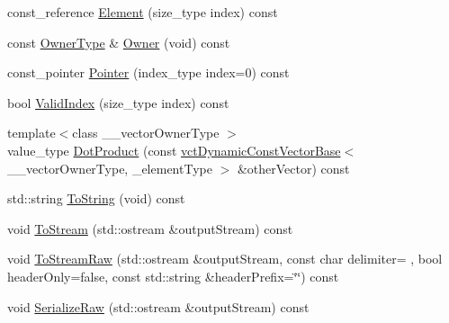 \begin{DoxyCompactItemize}
\item 
const\+\_\+reference \hyperlink{classvct_dynamic_const_vector_base_a0adf25034263fc4587ef5d118019eb6a}{Element} (size\+\_\+type index) const 
\item 
const \hyperlink{classvct_dynamic_const_vector_base_a6d92548fcc7076cbd4c091ceb0faf364}{Owner\+Type} \& \hyperlink{classvct_dynamic_const_vector_base_abc25ad1a425d8b221e3409092b89be68}{Owner} (void) const 
\item 
const\+\_\+pointer \hyperlink{classvct_dynamic_const_vector_base_ad78506ee5fdadb7c879ed4a5a57278e6}{Pointer} (index\+\_\+type index=0) const 
\item 
bool \hyperlink{classvct_dynamic_const_vector_base_a0329d61eeff85f488a78d065a3d092e2}{Valid\+Index} (size\+\_\+type index) const 
\item 
{\footnotesize template$<$class \+\_\+\+\_\+vector\+Owner\+Type $>$ }\\value\+\_\+type \hyperlink{classvct_dynamic_const_vector_base_a802f2332971a128c372a0f08bf0c405b}{Dot\+Product} (const \hyperlink{classvct_dynamic_const_vector_base}{vct\+Dynamic\+Const\+Vector\+Base}$<$ \+\_\+\+\_\+vector\+Owner\+Type, \+\_\+element\+Type $>$ \&other\+Vector) const 
\item 
std\+::string \hyperlink{classvct_dynamic_const_vector_base_a8ce660be7546ef58a69161493b92ce17}{To\+String} (void) const 
\item 
void \hyperlink{classvct_dynamic_const_vector_base_af7c7a1230789a78079b4c27dd5a16f1f}{To\+Stream} (std\+::ostream \&output\+Stream) const 
\item 
void \hyperlink{classvct_dynamic_const_vector_base_a56e9eb24d9eb1a98905394c530609bf7}{To\+Stream\+Raw} (std\+::ostream \&output\+Stream, const char delimiter= \textquotesingle{} \textquotesingle{}, bool header\+Only=false, const std\+::string \&header\+Prefix=\char`\"{}\char`\"{}) const 
\item 
void \hyperlink{classvct_dynamic_const_vector_base_af6641f0af4fedb1441b48639251fcbba}{Serialize\+Raw} (std\+::ostream \&output\+Stream) const 
\end{DoxyCompactItemize}
